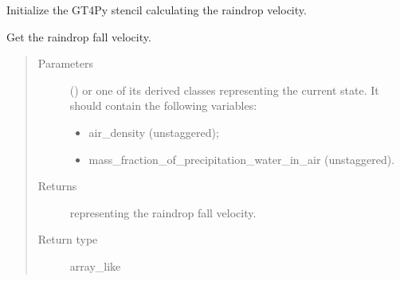 \documentclass[letterpaper,10pt,english]{sphinxmanual}
\begin{document}
\begin{fulllineitems}
\begin{fulllineitems}
\end{fulllineitems}


\begin{fulllineitems}
\label{\detokenize{api:parameterizations.adjustment_microphysics_kessler_wrf_saturation.AdjustmentMicrophysicsKesslerWRFSaturation._stencil_raindrop_fall_velocity_initialize}}
Initialize the GT4Py stencil calculating the raindrop velocity.

\end{fulllineitems}


\begin{fulllineitems}
\label{\detokenize{api:parameterizations.adjustment_microphysics_kessler_wrf_saturation.AdjustmentMicrophysicsKesslerWRFSaturation.get_raindrop_fall_velocity}}
Get the raindrop fall velocity.
\begin{quote}\begin{description}
\item[{Parameters}] \leavevmode
{} () \textendash{} 
{\hyperref[\detokenize{api:storages.grid_data.GridData}]{}} or one of its derived classes representing the current state.
It should contain the following variables:
\begin{itemize}
\item {} 
air\_density (unstaggered);

\item {} 
mass\_fraction\_of\_precipitation\_water\_in\_air (unstaggered).

\end{itemize}


\item[{Returns}] \leavevmode
{} representing the raindrop fall velocity.

\item[{Return type}] \leavevmode
array\_like

\end{description}\end{quote}

\end{fulllineitems}


\end{fulllineitems}
\end{document}
